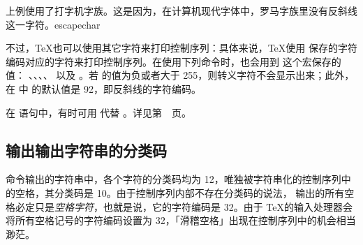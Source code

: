 \documentclass{book}
\begin{document}
上例使用了打字机字族。这是因为，在计算机现代字体中，罗马字族里没有反斜线这一字符。\cstoidx escapechar\par 不过，\TeX 也可以使用其它字符来打印控制序列：具体来说，\TeX 使用  保存的字符编码对应的字符来打印控制序列。在使用下列命令时，也会用到  这个宏保存的值： 、、、、 以及 。若  的值为负或者大于 255，则转义字符不会显示出来；此外，在 \IniTeX 中  的默认值是 92，即反斜线的字符编码。

在  语句中，有时可用  代替 。详见第~\pageref{expand:write}~页。

\subsection{ 输出输出字符串的分类码}

 命令输出的字符串中，各个字符的分类码均为 12，唯独被字符串化的控制序列中的空格，其分类码是 10。由于控制序列内部不存在分类码的说法， 输出的所有空格必定只是\emph{空格字符}，也就是说，它的字符编码是 32。由于 \TeX 的输入处理器会将所有空格记号的字符编码设置为 32，「滑稽空格」出现在控制序列中的机会相当渺茫。
\end{document}
